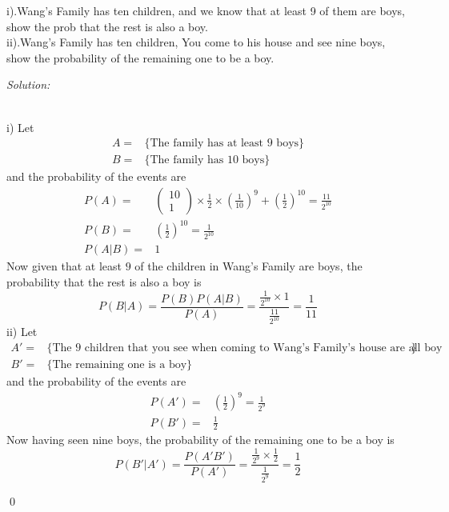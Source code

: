 \documentclass[12pt]{article}
\newenvironment{problem}[2][Problem]{\begin{trivlist}
\item[\hskip \labelsep {\bfseries #1}\hskip \labelsep {\bfseries #2.}]}{\end{trivlist}}
\newenvironment{sol}
    {\emph{Solution:}
    }
    {
    \qed
    }
\begin{document}
\begin{problem}{5}
i).Wang's Family has ten children, and we know that at least 9 of them are boys, show the prob that the rest is also a boy.\\
ii).Wang's Family has ten children, You come to his house and see nine boys, show the probability of the remaining one to be a boy.
\end{problem}
\begin{sol}
\\i) Let
\begin{align*}
A=&\{\text{The family has at least $9$ boys}\}\\
B=&\{\text{The family has $10$ boys}\}
\end{align*}
and the probability of the events are
\begin{align*}
P(A)=&\left(\begin{array}{c}10\\1\end{array}\right)\times\frac{1}{2}\times(\frac{1}{10})^9+(\frac{1}{2})^{10}=\frac{11}{2^{10}}\\
P(B)=&(\frac{1}{2})^{10}=\frac{1}{2^{10}}\\
P(A|B)=&1
\end{align*}
Now given that at least $9$ of the children in Wang's Family are boys, the probability that the rest is also a boy is
\[
P(B|A)=\frac{P(B)P(A|B)}{P(A)}=\frac{\frac{1}{2^{10}}\times1}{\frac{11}{2^{10}}}=\frac{1}{11}
\]
ii) Let
\begin{align*}
A'=&\{\text{The $9$ children that you see when coming to Wang's Family's house are all boy}\}\\
B'=&\{\text{The remaining one is a boy}\}
\end{align*}
and the probability of the events are
\begin{align*}
P(A')=&(\frac{1}{2})^9=\frac{1}{2^9}\\
P(B')=&\frac{1}{2}
\end{align*}
Now having seen nine boys, the probability of the remaining one to be a boy is
\[
P(B'|A')=\frac{P(A'B')}{P(A')}=\frac{\frac{1}{2^9}\times\frac{1}{2}}{\frac{1}{2^9}}=\frac{1}{2}
\]
\end{sol}
\end{document}
